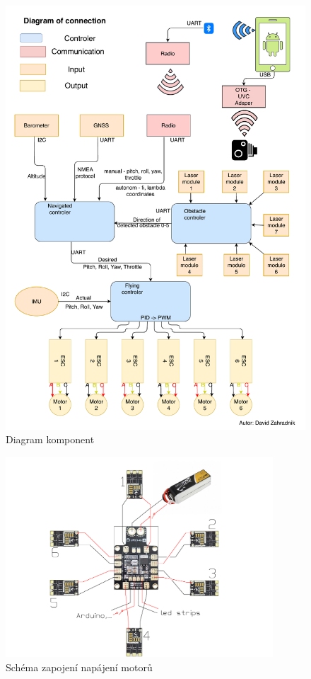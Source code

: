\begin{figure}[H]
	\centering
	\includegraphics[width=15cm]{pictures/DroneDiagram.pdf}
	\caption{Diagram komponent}
\end{figure}
\begin{figure}[h]
	\centering
	\includegraphics[width=10cm]{pictures/pdb_com.pdf}
	\caption{Schéma zapojení napájení motorů}
\end{figure}